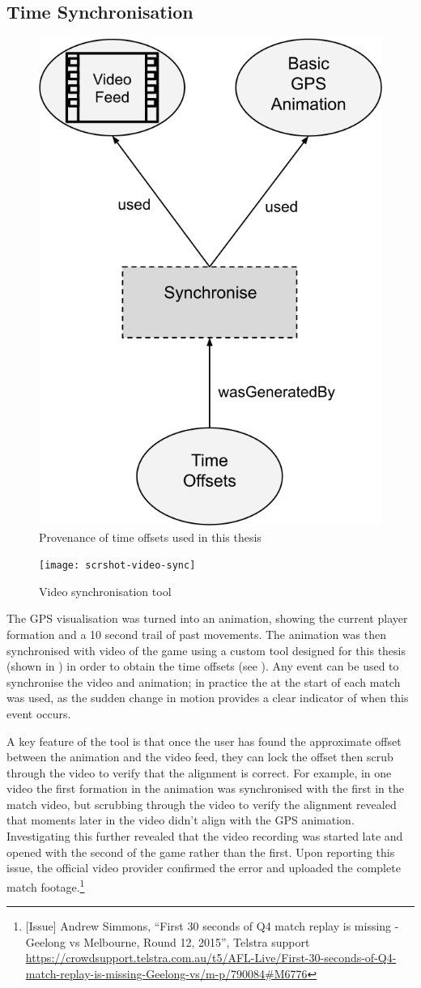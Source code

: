 \subsection{Time Synchronisation}
\label{sec:integration-timesync}

\begin{figure}[H]
\centering
\includegraphics[width=0.45\linewidth]{figs/prov/prov-5.png}
\caption{Provenance of time offsets used in this thesis \notationdetails{}
\label{fig:prov5}}
\end{figure}

\begin{figure}[htbp]
  \centering
  \texttt{[image: scrshot-video-sync]}
  \caption{Video synchronisation tool}
  \label{fig:scrshot-video-sync}
\end{figure}

The GPS visualisation was turned into an animation, showing the current player formation and a 10 second trail of past movements. The animation was then synchronised with video of the game using a custom tool designed for this thesis (shown in ) in order to obtain the time offsets (see ). Any event can be used to synchronise the video and animation; in practice the \centrebounce{} at the start of each match was used, as the sudden change in motion provides a clear indicator of when this event occurs.

A key feature of the tool is that once the user has found the approximate offset between the animation and the video feed, they can lock the offset then scrub through the video to verify that the alignment is correct. For example, in one video the first \centrebounce{} formation in the animation was synchronised with the first \centrebounce{} in the match video, but scrubbing through the video to verify the alignment revealed that moments later in the video didn't align with the GPS animation. Investigating this further revealed that the video recording was started late and opened with the second \centrebounce{} of the game rather than the first. Upon reporting this issue, the official video provider confirmed the error and uploaded the complete match footage.\footnote{[Issue] Andrew Simmons, ``First 30 seconds of Q4 match replay is missing - Geelong vs Melbourne, Round 12, 2015'', Telstra support \url{https://crowdsupport.telstra.com.au/t5/AFL-Live/First-30-seconds-of-Q4-match-replay-is-missing-Geelong-vs/m-p/790084\#M6776}}

